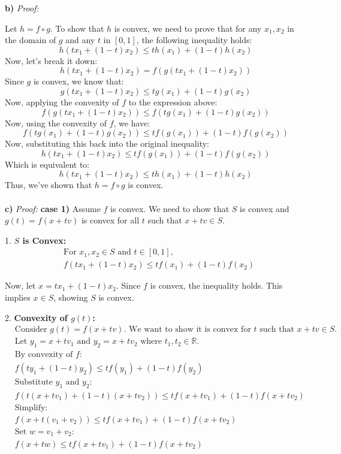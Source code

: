 \documentclass[12pt]{article}
\begin{document}
\textbf{b)} 
\textit{Proof:}

Let $h = f \circ g$. To show that $h$ is convex, we need to prove that for any $x_1, x_2$ in the domain of \(g\) and any \(t\) in \([0, 1]\), the following inequality holds:
\[
h(tx_1 + (1-t)x_2) \leq th(x_1) + (1-t)h(x_2)
\]
Now, let's break it down:
\[
h(tx_1 + (1-t)x_2) = f(g(tx_1 + (1-t)x_2))
\]
Since \(g\) is convex, we know that:
\[
g(tx_1 + (1-t)x_2) \leq tg(x_1) + (1-t)g(x_2)
\]
Now, applying the convexity of \(f\) to the expression above:
\[
f(g(tx_1 + (1-t)x_2)) \leq f(tg(x_1) + (1-t)g(x_2))
\]
Now, using the convexity of \(f\), we have:
\[
f(tg(x_1) + (1-t)g(x_2)) \leq tf(g(x_1)) + (1-t)f(g(x_2))
\]
Now, substituting this back into the original inequality:
\[
h(tx_1 + (1-t)x_2) \leq tf(g(x_1)) + (1-t)f(g(x_2))
\]
Which is equivalent to:
\[
h(tx_1 + (1-t)x_2) \leq th(x_1) + (1-t)h(x_2)
\]
Thus, we've shown that \(h = f \circ g\) is convex.\\
\\


\textbf{c)}
\textit{Proof:}
\textbf{case 1)}
Assume $f$ is convex. We need to show that $S$ is convex and $g(t) = f(x + tv)$ is convex for all $t$ such that $x + tv \in S$.

1. \textbf{$S$ is Convex:}
   \begin{align*}
   &\text{For } x_1, x_2 \in S \text{ and } t \in [0, 1], \\
   &f(tx_1 + (1-t)x_2) \leq tf(x_1) + (1-t)f(x_2)
   \end{align*}

   Now, let $x = tx_1 + (1-t)x_2$. Since $f$ is convex, the inequality holds. This implies $x \in S$, showing $S$ is convex.

2. \textbf{Convexity of $g(t)$:}
   \begin{align*}
   &\text{Consider } g(t) = f(x + tv). \text{ We want to show it is convex for } t \text{ such that } x + tv \in S. \\
   &\text{Let } y_1 = x + tv_1 \text{ and } y_2 = x + tv_2 \text{ where } t_1, t_2 \in \mathbb{R}. \\
   &\text{By convexity of } f: \\
   &f(ty_1 + (1-t)y_2) \leq tf(y_1) + (1-t)f(y_2) \\
   &\text{Substitute } y_1 \text{ and } y_2: \\
   &f(t(x + tv_1) + (1-t)(x + tv_2)) \leq t f(x + tv_1) + (1-t) f(x + tv_2) \\
   &\text{Simplify:} \\
   &f(x + t(v_1 + v_2)) \leq t f(x + tv_1) + (1-t) f(x + tv_2) \\
   &\text{Set } w = v_1 + v_2: \\
   &f(x + tw) \leq t f(x + tv_1) + (1-t) f(x + tv_2)
   \end{align*}
\end{document}
